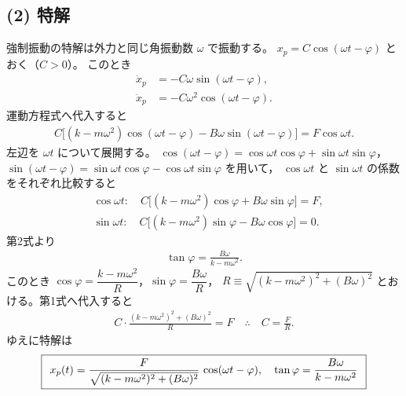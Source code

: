\documentclass[11pt,a4paper]{article}
\begin{document}
\subsection*{(2) 特解}
強制振動の特解は外力と同じ角振動数 $\omega$ で振動する。
$x_p = C\cos(\omega t-\varphi)$ とおく（$C>0$）。
このとき
\begin{align*}
  \dot{x}_p &= -C\omega\sin(\omega t-\varphi),\\
  \ddot{x}_p &= -C\omega^2\cos(\omega t-\varphi).
\end{align*}
運動方程式へ代入すると
\begin{align*}
  C\bigl[(k-m\omega^2)\cos(\omega t-\varphi)-B\omega\sin(\omega t-\varphi)\bigr]
  = F\cos\omega t.
\end{align*}
左辺を $\omega t$ について展開する。
$\cos(\omega t-\varphi)=\cos\omega t\cos\varphi+\sin\omega t\sin\varphi$，
$\sin(\omega t-\varphi)=\sin\omega t\cos\varphi-\cos\omega t\sin\varphi$ を用いて，
$\cos\omega t$ と $\sin\omega t$ の係数をそれぞれ比較すると
\begin{align*}
  &\cos\omega t:\quad C\bigl[(k-m\omega^2)\cos\varphi+B\omega\sin\varphi\bigr]=F,\\
  &\sin\omega t:\quad C\bigl[(k-m\omega^2)\sin\varphi-B\omega\cos\varphi\bigr]=0.
\end{align*}
第2式より
\begin{align*}
  \tan\varphi=\frac{B\omega}{k-m\omega^2}.
\end{align*}
このとき
$\cos\varphi=\dfrac{k-m\omega^2}{R}$，$\sin\varphi=\dfrac{B\omega}{R}$，
$R\equiv\sqrt{(k-m\omega^2)^2+(B\omega)^2}$ とおける。第1式へ代入すると
\begin{align*}
  C\cdot\frac{(k-m\omega^2)^2+(B\omega)^2}{R}=F
  \quad\therefore\quad C=\frac{F}{R}.
\end{align*}
ゆえに特解は
\[
  \boxed{\,\;
  x_p(t)=\dfrac{F}{\sqrt{(k-m\omega^2)^2+(B\omega)^2}}\,\cos(\omega t-\varphi),\quad
  \tan\varphi=\dfrac{B\omega}{k-m\omega^2}\;\,}
\]
\end{document}
